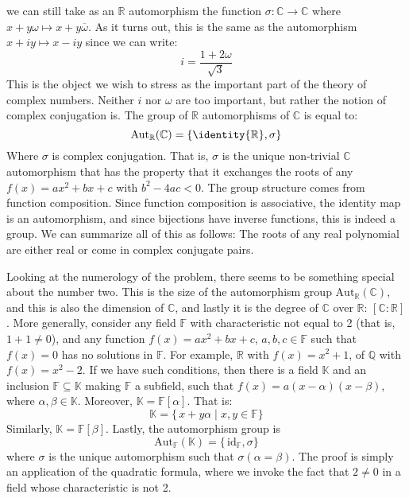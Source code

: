     we can still take as an $\mathbb{R}$ automorphism the function
    $\sigma:\mathbb{C}\rightarrow\mathbb{C}$ where
    $x+y\omega\mapsto{x}+y\overline{\omega}$. As it turns out, this is
    the same as the automorphism $x+iy\mapsto{x}-iy$ since we can write:
    \begin{equation}
        i=\frac{1+2\omega}{\sqrt{3}}
    \end{equation}
    This is the object we wish to stress as the important part of the
    theory of complex numbers. Neither $i$ nor $\omega$ are too
    important, but rather the notion of complex conjugation is.
    The group of $\mathbb{R}$ automorphisms of $\mathbb{C}$ is equal to:
    \begin{equation}
        \textrm{Aut}_{\mathbb{R}}(\mathbb{C})
            =\{\identity{\mathbb{R}},\sigma\}
    \end{equation}
    Where $\sigma$ is complex conjugation. That is, $\sigma$ is the
    unique non-trivial $\mathbb{C}$ automorphism that has the property
    that it exchanges the roots of any $f(x)=ax^{2}+bx+c$ with
    $b^{2}-4ac<0$. The group structure comes from function composition.
    Since function composition is associative, the identity map is an
    automorphism, and since bijections have inverse functions,
    this is indeed a group. We can summarize all of this as follows:
    The roots of any real polynomial are either real or come in complex
    conjugate pairs.
    \par\hfill\par
    Looking at the numerology of the problem, there seems to be
    something special about the number two. This is the size of the
    automorphism group $\textrm{Aut}_{\mathbb{R}}(\mathbb{C})$, and
    this is also the dimension of $\mathbb{C}$, and lastly it is the
    degree of $\mathbb{C}$ over $\mathbb{R}$: $[\mathbb{C}:\mathbb{R}]$.
    More generally, consider any field $\mathbb{F}$ with characteristic
    not equal to 2 (that is, $1+1\ne{0}$), and any function
    $f(x)=ax^{2}+bx+c$, $a,b,c\in\mathbb{F}$ such that $f(x)=0$ has no
    solutions in $\mathbb{F}$. For example, $\mathbb{R}$ with
    $f(x)=x^{2}+1$, of $\mathbb{Q}$ with $f(x)=x^{2}-2$. If we have
    such conditions, then there is a field $\mathbb{K}$ and an inclusion
    $\mathbb{F}\subseteq\mathbb{K}$ making $\mathbb{F}$ a subfield,
    such that $f(x)=a(x-\alpha)(x-\beta)$, where
    $\alpha,\beta\in\mathbb{K}$. Moreover,
    $\mathbb{K}=\mathbb{F}[\alpha]$. That is:
    \begin{equation}
        \mathbb{K}=\{\,x+y\alpha\;|\;x,y\in\mathbb{F}\}
    \end{equation}
    Similarly, $\mathbb{K}=\mathbb{F}[\beta]$. Lastly, the automorphism
    group is
    \begin{equation}
        \textrm{Aut}_{\mathbb{F}}(\mathbb{K})
        =\{\,\textrm{id}_{\mathbb{F}},\sigma\}
    \end{equation}
    where $\sigma$ is the unique automorphism such that
    $\sigma(\alpha=\beta)$. The proof is simply an application of the
    quadratic formula, where we invoke the fact that $2\ne{0}$ in a
    field whose characteristic is not 2.
